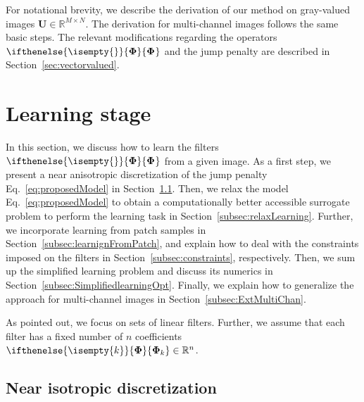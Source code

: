 \documentclass[journal]{IEEEtran}
\newcommand{\Idea}[1]{{\ifdefined\DRAFT{\color{blue}#1}\fi}}
\newcommand{\Matrix}[1]{\mathbf{#1}}
\newcommand{\R}[1]{\mathbb{R}^{#1}}
\newcommand{\AOF}[1]{\ifthenelse{\isempty{#1}}{\boldsymbol{\Phi}}{\boldsymbol{\Phi}_{#1}}}
\newcommand{\SCI}{\Matrix{U}}
\begin{document}
For notational brevity, 
we describe the derivation of our method on gray-valued images $\SCI \in \mathbb{R}^{M \times N}$. 
The derivation for multi-channel images follows
the same basic steps. The relevant modifications
regarding the operators $\AOF{}$ and the jump penalty
are described in Section~\ref{sec:vectorvalued}.





\Idea{PRINZIP MIT BILD ILLUSTRIEREN}

\section{Learning stage} \label{sec:filter_learning}

In this section, we discuss how to learn the filters  $\AOF{}$ from a given image.
As a first step, we present a near anisotropic discretization  
of the jump penalty Eq.~\eqref{eq:proposedModel} in Section~\ref{subsec:discretize}.
Then, we relax the model Eq.~\eqref{eq:proposedModel} 
to obtain a computationally better accessible surrogate problem
to perform the learning task in Section~\ref{subsec:relaxLearning}.
Further, we incorporate learning from patch samples in Section~\ref{subsec:learnignFromPatch},
and explain how to deal with the constraints imposed on the filters in Section~\ref{subsec:constraints}, respectively. Then, we sum up the simplified learning problem
and discuss its numerics in Section~\ref{subsec:SimplifiedlearningOpt}.
Finally, we explain how to generalize the approach for multi-channel images
in Section~\ref{subsec:ExtMultiChan}.

As pointed out, we focus on sets of linear filters.
Further, we assume that each filter has a fixed number of $n$ coefficients $\AOF{k} \in \R{n}$.


\subsection{Near isotropic discretization}
\label{subsec:discretize}
\end{document}
